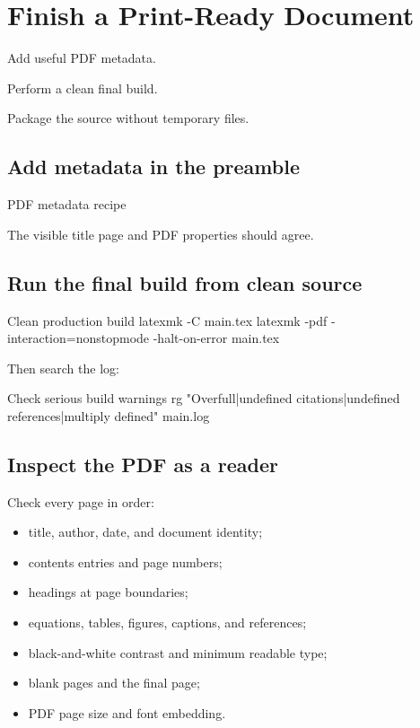 \chapter{Finish a Print-Ready Document}
\label{chap:finish}

\begin{learningoutcomes}
  \item Add useful PDF metadata.
  \item Perform a clean final build.
  \item Package the source without temporary files.
\end{learningoutcomes}

\section{Add metadata in the preamble}

\begin{latexcode}{PDF metadata recipe}
\usepackage{hyperref}
\end{latexcode}

The visible title page and PDF properties should agree.

\section{Run the final build from clean source}

\begin{terminalcode}{Clean production build}
latexmk -C main.tex
latexmk -pdf -interaction=nonstopmode -halt-on-error main.tex
\end{terminalcode}

Then search the log:

\begin{terminalcode}{Check serious build warnings}
rg "Overfull|undefined citations|undefined references|multiply defined" main.log
\end{terminalcode}

\section{Inspect the PDF as a reader}

Check every page in order:

\begin{itemize}
  \item title, author, date, and document identity;
  \item contents entries and page numbers;
  \item headings at page boundaries;
  \item equations, tables, figures, captions, and references;
  \item black-and-white contrast and minimum readable type;
  \item blank pages and the final page;
  \item PDF page size and font embedding.
\end{itemize}

